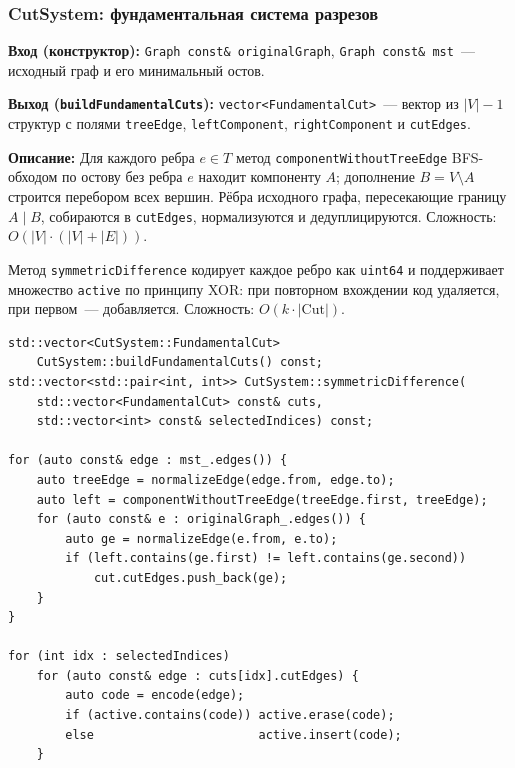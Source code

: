 \subsubsection{CutSystem: фундаментальная система разрезов}

\textbf{Вход (конструктор):} \texttt{Graph const\& originalGraph},
\texttt{Graph const\& mst}~--- исходный граф и его минимальный остов.

\textbf{Выход (\texttt{buildFundamentalCuts}):}
\texttt{vector<FundamentalCut>}~--- вектор из $|V|-1$ структур с
полями \texttt{treeEdge}, \texttt{leftComponent},
\texttt{rightComponent} и \texttt{cutEdges}.

\textbf{Описание:} Для каждого ребра $e \in T$ метод
\texttt{componentWithoutTreeEdge} BFS-обходом по остову без ребра $e$
находит компоненту $A$; дополнение $B = V \setminus A$ строится
перебором всех вершин. Рёбра исходного графа, пересекающие границу
$A \mid B$, собираются в \texttt{cutEdges}, нормализуются и
дедуплицируются. Сложность: $O(|V| \cdot (|V| + |E|))$.

Метод \texttt{symmetricDifference} кодирует каждое ребро как
\texttt{uint64} и поддерживает множество \texttt{active} по принципу
XOR: при повторном вхождении код удаляется, при первом~--- добавляется.
Сложность: $O(k \cdot |\mathrm{Cut}|)$.

\begin{lstlisting}[style=cppstyle, caption={Построение ФСР и симметрическая разность (CutSystem.cc)}]
std::vector<CutSystem::FundamentalCut>
    CutSystem::buildFundamentalCuts() const;
std::vector<std::pair<int, int>> CutSystem::symmetricDifference(
    std::vector<FundamentalCut> const& cuts,
    std::vector<int> const& selectedIndices) const;

for (auto const& edge : mst_.edges()) {
    auto treeEdge = normalizeEdge(edge.from, edge.to);
    auto left = componentWithoutTreeEdge(treeEdge.first, treeEdge);
    for (auto const& e : originalGraph_.edges()) {
        auto ge = normalizeEdge(e.from, e.to);
        if (left.contains(ge.first) != left.contains(ge.second))
            cut.cutEdges.push_back(ge);
    }
}

for (int idx : selectedIndices)
    for (auto const& edge : cuts[idx].cutEdges) {
        auto code = encode(edge);
        if (active.contains(code)) active.erase(code);
        else                       active.insert(code);
    }
\end{lstlisting}
